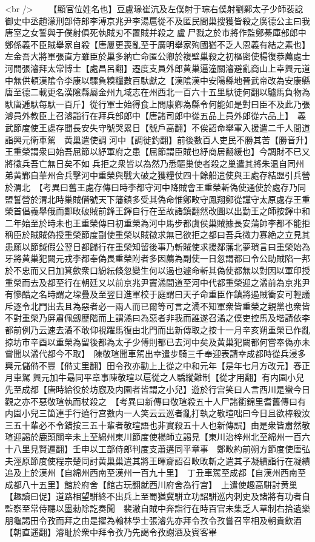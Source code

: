 <br />
　　【顯官位姓名也】豆盧瑑崔沆及左僕射于琮右僕射劉鄴太子少師裴諗御史中丞趙濛刑部侍郎李溥京兆尹李湯扈從不及匿民間巢搜獲皆殺之廣德公主曰我唐室之女誓與于僕射俱死執賊刃不置賊并殺之盧尸戮之於市將作監鄭綦庫部郎中鄭係義不臣賊舉家自殺【唐屢更喪亂至于廣明舉家殉國猶不乏人恩義有結之素也】左金吾大將軍張直方雖臣於巢多納亡命匿公卿於複壁巢殺之初樞密使楊復恭薦處士河間張濬拜太常博士【處昌呂翻】遷度支員外郎黄巢逼潼關濬避亂商山上幸興元道中無供頓漢隂令李康以騾負糗糧數百馱獻之【漢隂漢中安陽縣地晉武帝改為安康縣唐至德二載更名漢隂縣屬金州九域志在州西北一百六十五里馱徒何翻以驢馬負物為馱唐逓馱每馱一百斤】從行軍士始得食上問康卿為縣令何能如是對曰臣不及此乃張濬員外教臣上召濬詣行在拜兵部郎中【唐諸司郎中從五品上員外郎從六品上】　義武節度使王處存聞長安失守號哭累日【號戶高翻】不俟詔命舉軍入援遣二千人間道詣興元衛車駕　黄巢遣使調河中【調徙釣翻】前後數百人吏民不勝其苦【勝音升】王重榮謂衆曰始吾屈節以紓軍府之患【屈節謂臣賊也紓商居翻緩也】今調財不已又將徵兵吾亡無日矣不如兵拒之衆皆以為然乃悉驅巢使者殺之巢遣其將朱温自同州弟黄鄴自華州合兵擊河中重榮與戰大破之獲糧仗四十餘船遣使與王處存結盟引兵營於渭北　【考異曰舊王處存傳曰時李都守河中降賊會王重榮斬偽使通使於處存乃同盟誓營於渭北時巢賊僭號天下藩鎮多受其偽命惟鄭畋守鳳翔鄭從讜守太原處存王重榮首倡義舉俄而鄭畋破賊前鋒王鐸自行在至故諸鎮翻然改圖以出勤王之師按鐸中和二年始至於時未也王重榮傳曰初重榮為河中馬步都虞侯巢賊據長安蒲帥李都不能拒稱臣於賊賊偽授重榮節度副使重榮以賊徵求無已欲拒之都曰吾兵微力寡絶之立見其患願以節鉞假公翌日都歸行在重榮知留後事乃斬賊使求援鄰藩北夢瑣言曰重榮始為牙將黄巢犯闕元戎李都奉偽畏重榮附者多因薦為副使一日忽謂都曰令公助賊陷一邦於不忠而又日加箕歛衆口紛紜倏忽變生何以遏也遽命斬其偽使都無以對因以軍印授重榮而去及都至行在朝廷又以前京兆尹竇潏間道至河中代都重榮迎之潏前為京兆尹有慘酷之名時謂之垜疊及至翌日進軍校于庭謂曰天子命重臣作鎮將遏賊衝安可輕議斥逐令北門出去且為惡者必一兩人而已爾等可言之潏不知軍衆皆重榮之親黨也衆皆不對重榮乃屏肅佩劔歷階而上謂潏曰為惡者非我而誰遂召潏之僕吏控馬及堦請依李都前例乃云速去潏不敢仰視躍馬復由北門而出新傳取之按十一月辛亥朔重榮已作亂掠坊市辛酉以重榮為留後都為太子少傅則都已去河中矣及黄巢犯闕都何嘗奉偽亦未嘗聞以潏代都今不取】　陳敬瑄聞車駕出幸遣步騎三千奉迎表請幸成都時從兵浸多興元儲偫不豐【偫丈里翻】田令孜亦勸上上從之中和元年【是年七月方改元】春正月車駕興元加牛朂同平章事陳敬瑄以扈從之人驕縱難制【從才用翻】有内園小兒先至成都【唐時給役於坊廐及内園者皆謂之小兒】遊於行宫笑曰人言西川是蠻今日觀之亦不惡敬瑄執而杖殺之　【考異曰新傳曰敬瑄殺五十人尸諸衢錦里耆舊傳曰有内園小兒三箇連手行遶行宫數内一人笑云云巡者亂打執之敬瑄咄曰今日且欲棒殺汝三五十輩必不令錯按三五十輩者敬瑄語也非實殺五十人也新傳誤】由是衆皆肅然敬瑄迎謁於鹿頭關辛未上至綿州東川節度使楊師立謁見【東川治梓州北至綿州一百六十八里見賢遍翻】壬申以工部侍郎判度支蕭遘同平章事　鄭畋約前朔方節度使唐弘夫涇原節度使程宗楚同討黄巢巢遣其將王暉齎詔召畋畋斬之遣其子凝績詣行在凝績追及上於漢州【自綿州西南至漢州一百九十里】　丁丑車駕至成都【自漢州西南至成都八十五里】館於府舍【館古玩翻就西川府舍為行宫】　上遣使趣高駢討黄巢【趣讀曰促】道路相望駢終不出兵上至蜀猶冀駢立功詔駢巡内刺史及諸將有功者自監察至常侍聽以墨勑除訖奏聞　裴澈自賊中奔詣行在時百官未集乏人草制右拾遺樂朋龜謁田令孜而拜之由是擢為翰林學士張濬先亦拜令孜令孜嘗召宰相及朝貴飲酒【朝直遥翻】濬耻於衆中拜令孜乃先謁令孜謝酒及賓客畢